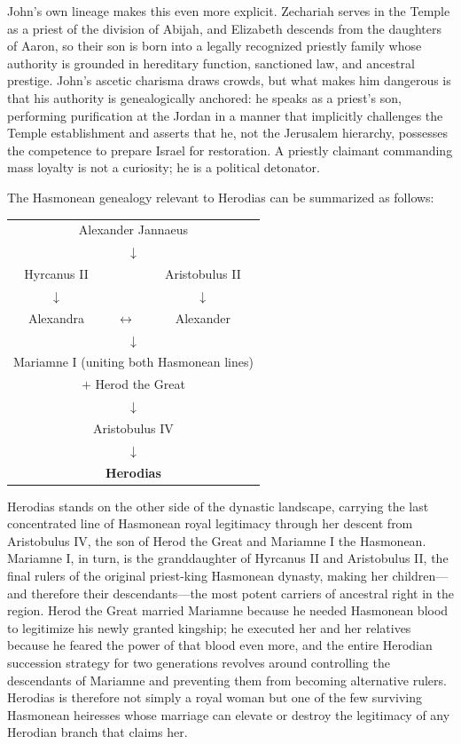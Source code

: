John's own lineage makes this even more explicit.
Zechariah serves in the Temple as a priest of the division of Abijah, and Elizabeth descends from the daughters of Aaron, so their son is born into a legally recognized priestly family whose authority is grounded in hereditary function, sanctioned law, and ancestral prestige.
John's ascetic charisma draws crowds, but what makes him dangerous is that his authority is genealogically anchored: he speaks as a priest's son, performing purification at the Jordan in a manner that implicitly challenges the Temple establishment and asserts that he, not the Jerusalem hierarchy, possesses the competence to prepare Israel for restoration.
A priestly claimant commanding mass loyalty is not a curiosity; he is a political detonator.

The Hasmonean genealogy relevant to Herodias can be summarized as follows:

\begin{center}
\begin{tabular}{ccc}
\multicolumn{3}{c}{Alexander Jannaeus} \\
\multicolumn{3}{c}{$\downarrow$} \\
Hyrcanus II & & Aristobulus II \\
$\downarrow$ & & $\downarrow$ \\
Alexandra & $\longleftrightarrow$ & Alexander \\
\multicolumn{3}{c}{$\downarrow$} \\
\multicolumn{3}{c}{Mariamne I (uniting both Hasmonean lines)} \\
\multicolumn{3}{c}{$+$ Herod the Great} \\
\multicolumn{3}{c}{$\downarrow$} \\
\multicolumn{3}{c}{Aristobulus IV} \\
\multicolumn{3}{c}{$\downarrow$} \\
\multicolumn{3}{c}{\textbf{Herodias}} \\
\end{tabular}
\end{center}

Herodias stands on the other side of the dynastic landscape, carrying the last concentrated line of Hasmonean royal legitimacy through her descent from Aristobulus IV, the son of Herod the Great and Mariamne I the Hasmonean.
Mariamne I, in turn, is the granddaughter of Hyrcanus II and Aristobulus II, the final rulers of the original priest-king Hasmonean dynasty, making her children---and therefore their descendants---the most potent carriers of ancestral right in the region.
Herod the Great married Mariamne because he needed Hasmonean blood to legitimize his newly granted kingship; he executed her and her relatives because he feared the power of that blood even more, and the entire Herodian succession strategy for two generations revolves around controlling the descendants of Mariamne and preventing them from becoming alternative rulers.
Herodias is therefore not simply a royal woman but one of the few surviving Hasmonean heiresses whose marriage can elevate or destroy the legitimacy of any Herodian branch that claims her.

